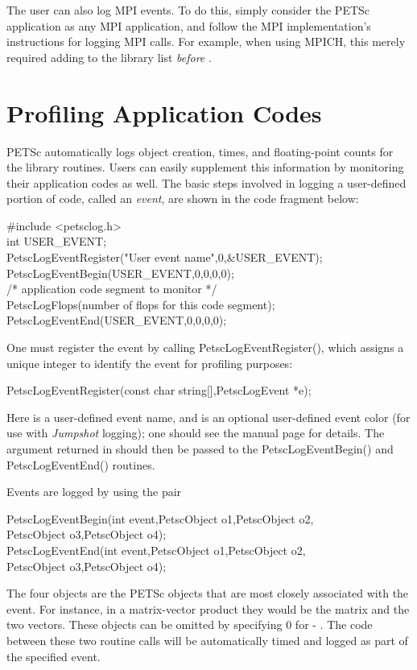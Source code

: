 {{The user can also log MPI events.  To do this, simply consider the
PETSc application as any MPI application, and follow the MPI
implementation's instructions for logging MPI calls. For example, when
using MPICH, this merely required adding  to the library
list {\em before} .

\section{Profiling Application Codes}
\label{sec_profileuser}

PETSc automatically logs object creation, times, and floating-point
counts for the library routines. Users can easily supplement
this information by monitoring their application codes as well.
The basic steps involved in logging a
user-defined portion of code, called an {\em event}, are shown in the
code fragment below:
\begin{tabbing}
    \#include <petsclog.h>\\
    int USER\_EVENT;\\
    PetscLogEventRegister("User event name",0,\&USER\_EVENT);\\
    PetscLogEventBegin(USER\_EVENT,0,0,0,0);\\
       /* application code segment to monitor */\\
       PetscLogFlops(number of flops for this code segment);\\
    PetscLogEventEnd(USER\_EVENT,0,0,0,0);
\end{tabbing}

One must register the event by calling PetscLogEventRegister(), which assigns a unique integer to identify the
event for profiling purposes:
\begin{tabbing}
  PetscLogEventRegister(const char string[],PetscLogEvent *e);
\end{tabbing}
Here  is a user-defined event name, and  is an
optional user-defined event color (for use with {\em Jumpshot} logging);
one should see the manual page for details.  The argument returned in  should then
be passed to the PetscLogEventBegin() and PetscLogEventEnd()
routines.

Events are logged by using the pair
\begin{tabbing}
   PetscLogEventBegin(int event,PetscObject o1,PetscObject o2,\\
                      PetscObject o3,PetscObject o4);\\
   PetscLogEventEnd(int event,PetscObject o1,PetscObject o2,\\
                    PetscObject o3,PetscObject o4);
\end{tabbing}
The
four objects are the PETSc objects that are most closely associated
with the event.  For instance, in a matrix-vector product they
would be the matrix and the two vectors.  These objects can be omitted
by specifying 0 for  - .  The code between these
two routine calls will be automatically timed and logged as part of the
specified event.

}}
